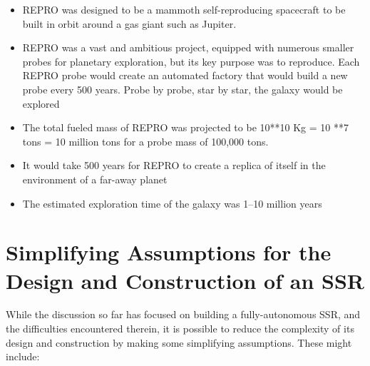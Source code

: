 \begin{itemize}
\item REPRO was designed to be a mammoth self-reproducing spacecraft to be built in
orbit around a gas giant such as Jupiter.
\item REPRO was a vast and ambitious project, equipped with numerous
smaller probes for planetary exploration, but its key purpose was to
reproduce. Each REPRO probe would create an automated factory that
would build a new probe every 500 years. Probe by probe, star by star,
the galaxy would be explored 
\item The total fueled mass of REPRO was projected to be 10**10 Kg = 10
**7 tons = 10 million tons for a probe mass of 100,000 tons.
\item It would take 500 years for REPRO to create a replica of itself in the
environment of a far-away planet
\item The estimated exploration time of the galaxy was 1--10 million
years
\end{itemize}

\section{Simplifying Assumptions for the Design and Construction of an SSR}

While the discussion so far has focused on building a fully-autonomous SSR, and
the difficulties encountered therein,
it is possible to reduce the complexity of its design and construction by making
some simplifying assumptions.  These might include:

